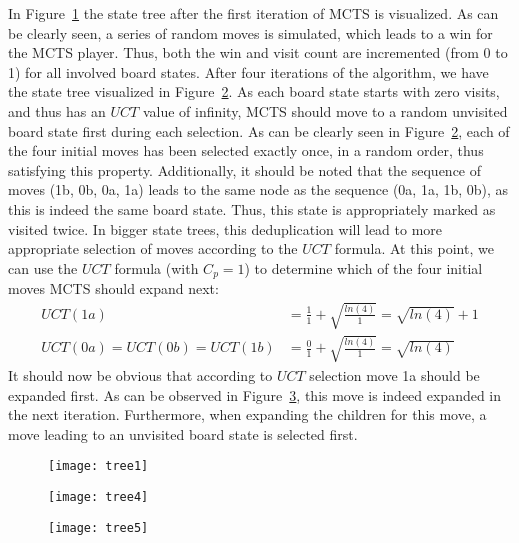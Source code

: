 \documentclass{article}
\begin{document}
In Figure~\ref{fig:tree1} the state tree after the first iteration of MCTS is visualized. As can be clearly seen, a series of random moves is simulated, which leads to a win for the MCTS player. Thus, both the win and visit count are incremented (from 0 to 1) for all involved board states. After four iterations of the algorithm, we have the state tree visualized in Figure~\ref{fig:tree2}. As each board state starts with zero visits, and thus has an $UCT$ value of infinity, MCTS should move to a random unvisited board state first during each selection. As can be clearly seen in Figure~\ref{fig:tree2}, each of the four initial moves has been selected exactly once, in a random order, thus satisfying this property. Additionally, it should be noted that the sequence of moves (1b, 0b, 0a, 1a) leads to the same node as the sequence (0a, 1a, 1b, 0b), as this is indeed the same board state. Thus, this state is appropriately marked as visited twice. In bigger state trees, this deduplication will lead to more appropriate selection of moves according to the $UCT$ formula. At this point, we can use the $UCT$ formula (with $C_p = 1$) to determine which of the four initial moves MCTS should expand next:
\begin{align}
UCT(1a) &= \frac{1}{1} + \sqrt{\frac{ln(4)}{1}} = \sqrt{ln(4)} + 1 \\
UCT(0a) = UCT(0b) = UCT(1b) &= \frac{0}{1} + \sqrt{\frac{ln(4)}{1}} = \sqrt{ln(4)}
\end{align}
It should now be obvious that according to $UCT$ selection move 1a should be expanded first. As can be observed in Figure~\ref{fig:tree3}, this move is indeed expanded in the next iteration. Furthermore, when expanding the children for this move, a move leading to an unvisited board state is selected first.

\begin{figure}[H]
\centering
\texttt{[image: tree1]}
\label{fig:tree1}
\end{figure}
\begin{figure}[H]
\centering
\texttt{[image: tree4]}
\label{fig:tree2}
\end{figure}
\begin{figure}[H]
\centering
\texttt{[image: tree5]}
\label{fig:tree3}
\end{figure}
\end{document}
